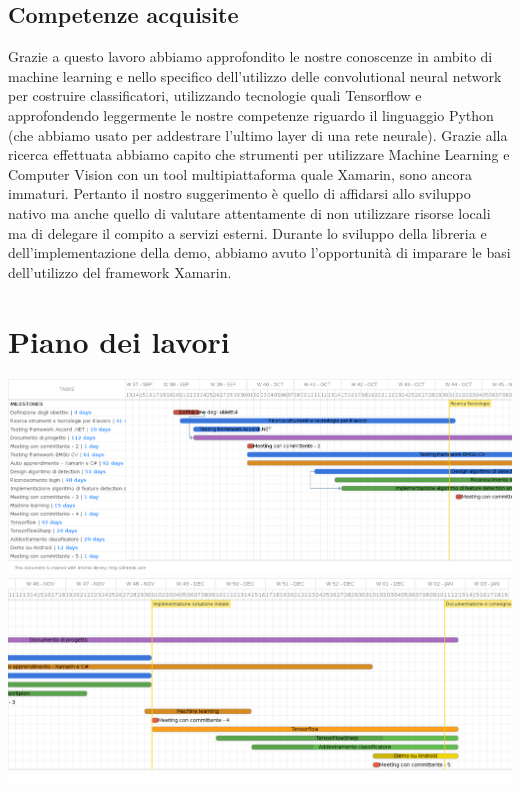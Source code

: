 \documentclass[twoside]{supsistudent}
\newcommand{\Decaa}{\newline\vspace{0.5mm}\newline\noindent}
\begin{document}
\section{Competenze acquisite}%
Grazie a questo lavoro abbiamo approfondito le nostre conoscenze in ambito di machine learning e nello specifico dell'utilizzo delle convolutional neural network per costruire classificatori, utilizzando tecnologie quali Tensorflow e approfondendo leggermente le nostre competenze riguardo il linguaggio Python (che abbiamo usato per addestrare l'ultimo layer di una rete neurale). Grazie alla ricerca effettuata abbiamo capito che strumenti per utilizzare Machine Learning e Computer Vision con un tool multipiattaforma quale Xamarin, sono ancora immaturi. Pertanto il nostro suggerimento è quello di affidarsi allo sviluppo nativo ma anche quello di valutare attentamente di non utilizzare risorse locali ma di delegare il compito a servizi esterni. 
\Decaa
Durante lo sviluppo della libreria e dell'implementazione della demo, abbiamo avuto l'opportunità di imparare le basi dell'utilizzo del framework Xamarin. 

\chapter{Piano dei lavori}%
\includegraphics[width=\textwidth]{Pictures/Piano_lavori1.png}
\includegraphics[width=\textwidth]{Pictures/Piano_lavori2.png}


\end{document}
